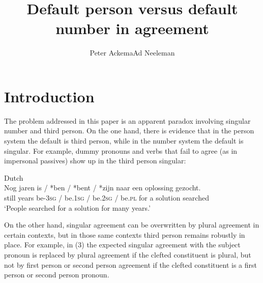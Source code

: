 \documentclass[output=paper]{langsci/langscibook}
\title{Default person versus default number in agreement}
\author{Peter Ackema\affiliation{University of Edinburgh}\lastand Ad Neeleman\affiliation{UCL}}
\begin{document}
 

 

 

 

 

\section{Introduction}

The problem addressed in this paper is an apparent paradox involving singular number and third person. On the one hand, there is evidence that in the person system the default is third person, while in the number system the default is singular. For example, dummy pronouns and verbs that fail to agree (as in impersonal passives) show up in the third person singular:

\ea 
  \z
\z

\ea Dutch \\
\gll Nog  jaren  is / *ben / *bent / *zijn              naar een oplossing gezocht.\\
  still years  be-\textsc{3sg} / be.\textsc{1sg} / be.\textsc{2sg} / be.\textsc{pl} for   a    solution   searched\\
\glt ‘People searched for a solution for many years.’
\z

On the other hand, singular agreement can be overwritten by plural agreement in certain contexts, but in those same contexts third person remains robustly in place. For example, in (3) the expected singular agreement with the subject pronoun is replaced by plural agreement if the clefted constituent is plural, but not by first person or second person agreement if the clefted constituent is a first person or second person pronoun.
\end{document}
